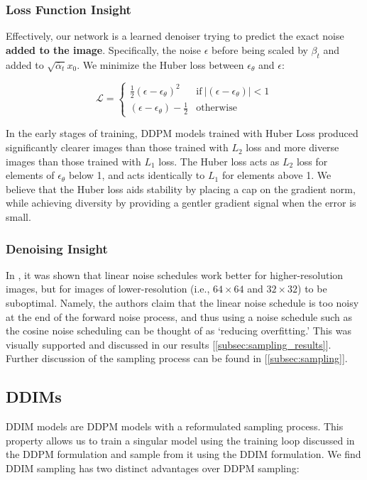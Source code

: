 \documentclass[10pt,twocolumn,letterpaper]{article}
\begin{document}
\subsubsection{Loss Function Insight}

Effectively, our network is a learned denoiser trying to predict the exact noise \textbf{added to the image}. Specifically, the noise $\epsilon$ before being scaled by $\beta_t$ and added to $\sqrt{\bar{\alpha}_t} x_0$. We minimize the Huber loss \cite{HUBER} between $\epsilon_\theta$ and $\epsilon$:

$$\mathcal{L} =
    \left\{\begin{matrix}
        \frac{1}{2}(\epsilon - \epsilon_\theta)^{2} & \text{if} \ \left | (\epsilon - \epsilon_\theta)  \right | < 1\\
        (\epsilon - \epsilon_\theta) - \frac{1}{2} & \text{otherwise}
    \end{matrix}\right.$$
    
In the early stages of training, DDPM models trained with Huber Loss \cite{HUBER} produced significantly clearer images than those trained with $L_2$ loss and more diverse images than those trained with $L_1$ loss. The Huber loss acts as $L_2$ loss for elements of $\epsilon_\theta$ below 1, and acts identically to $L_1$ for elements above 1. We believe that the Huber loss aids stability by placing a cap on the gradient norm, while achieving diversity by providing a gentler gradient signal when the error is small.
\subsubsection{Denoising Insight}
In \cite{IDDPM}, it was shown that linear noise schedules work better for higher-resolution images, but for images of lower-resolution (i.e., $64 \times 64$ and $32 \times 32$) to be suboptimal. Namely, the authors claim that the linear noise schedule is too noisy at the end of the forward noise process, and thus using a noise schedule such as the cosine noise scheduling can be thought of as `reducing overfitting.' This was visually supported and discussed in our results [\ref{subsec:sampling_results}]. Further discussion of the sampling process can be found in [\ref{subsec:sampling}].

\hfill



\subsection{DDIMs}
\label{subsec:disc_ddims}
DDIM models \cite{DDIM} are DDPM models with a reformulated sampling process. This property allows us to train a singular model using the training loop discussed in the DDPM formulation \cite{DDPM} and sample from it using the DDIM formulation. We find DDIM sampling has two distinct advantages over DDPM sampling:
\end{document}
